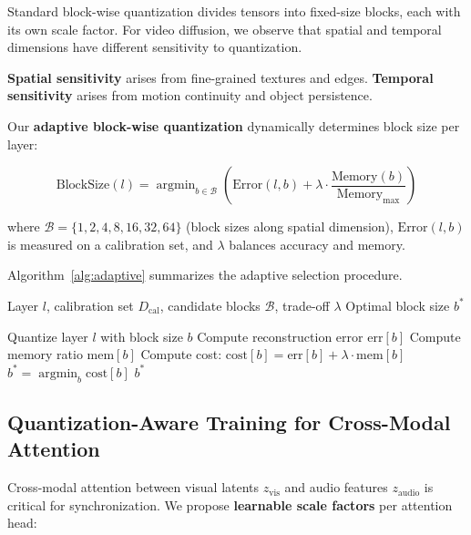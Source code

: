 \documentclass[journal,twoside]{IEEEtran}
\theoremstyle{definition}
\theoremstyle{remark}
\newcommand{\argmin}{\operatorname{argmin}}
\begin{document}
Standard block-wise quantization \cite{dettmers2022llm} divides tensors into fixed-size blocks, each with its own scale factor. For video diffusion, we observe that spatial and temporal dimensions have different sensitivity to quantization.

\textbf{Spatial sensitivity} arises from fine-grained textures and edges. \textbf{Temporal sensitivity} arises from motion continuity and object persistence.

Our \textbf{adaptive block-wise quantization} dynamically determines block size per layer:

\begin{equation}
\text{BlockSize}(l) = \argmin_{b \in \mathcal{B}} \left( \text{Error}(l, b) + \lambda \cdot \frac{\text{Memory}(b)}{\text{Memory}_{\text{max}}} \right)
\end{equation}

where $\mathcal{B} = \{1, 2, 4, 8, 16, 32, 64\}$ (block sizes along spatial dimension), $\text{Error}(l,b)$ is measured on a calibration set, and $\lambda$ balances accuracy and memory.

Algorithm~\ref{alg:adaptive} summarizes the adaptive selection procedure.

\begin{algorithm}[!htbp]
\footnotesize
\caption{Adaptive Block-Wise Quantization}
\label{alg:adaptive}
\begin{algorithmic}[1]
\REQUIRE Layer $l$, calibration set $D_{\text{cal}}$, candidate blocks $\mathcal{B}$, trade-off $\lambda$
\ENSURE Optimal block size $b^*$

    \STATE Quantize layer $l$ with block size $b$
    \STATE Compute reconstruction error $\text{err}[b]$
    \STATE Compute memory ratio $\text{mem}[b]$
    \STATE Compute cost: $\text{cost}[b] = \text{err}[b] + \lambda \cdot \text{mem}[b]$
\ENDFOR
\STATE $b^* = \argmin_b \text{cost}[b]$
\RETURN $b^*$
\end{algorithmic}
\end{algorithm}

\subsection{Quantization-Aware Training for Cross-Modal Attention}

Cross-modal attention between visual latents $z_{\text{vis}}$ and audio features $z_{\text{audio}}$ is critical for synchronization. We propose \textbf{learnable scale factors} per attention head:
\end{document}
